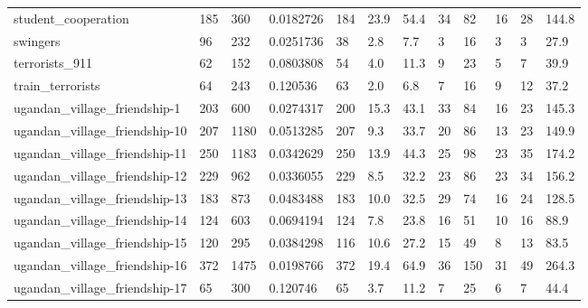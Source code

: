 \begin{longtable}{llllllllllll}
 student\_cooperation                                & 185        & 360       & 0.0182726   & 184   & 23.9   & 54.4   & 34    & 82     & 16     & 28     & 144.8   \\
 swingers                                           & 96         & 232       & 0.0251736   & 38    & 2.8    & 7.7    & 3     & 16     & 3      & 3      & 27.9    \\
 terrorists\_911                                     & 62         & 152       & 0.0803808   & 54    & 4.0    & 11.3   & 9     & 23     & 5      & 7      & 39.9    \\
 train\_terrorists                                   & 64         & 243       & 0.120536    & 63    & 2.0    & 6.8    & 7     & 16     & 9      & 12     & 37.2    \\
 ugandan\_village\_friendship-1                       & 203        & 600       & 0.0274317   & 200   & 15.3   & 43.1   & 33    & 84     & 16     & 23     & 145.3   \\
 ugandan\_village\_friendship-10                      & 207        & 1180      & 0.0513285   & 207   & 9.3    & 33.7   & 20    & 86     & 13     & 23     & 149.9   \\
 ugandan\_village\_friendship-11                      & 250        & 1183      & 0.0342629   & 250   & 13.9   & 44.3   & 25    & 98     & 23     & 35     & 174.2   \\
 ugandan\_village\_friendship-12                      & 229        & 962       & 0.0336055   & 229   & 8.5    & 32.2   & 23    & 86     & 23     & 34     & 156.2   \\
 ugandan\_village\_friendship-13                      & 183        & 873       & 0.0483488   & 183   & 10.0   & 32.5   & 29    & 74     & 16     & 24     & 128.5   \\
 ugandan\_village\_friendship-14                      & 124        & 603       & 0.0694194   & 124   & 7.8    & 23.8   & 16    & 51     & 10     & 16     & 88.9    \\
 ugandan\_village\_friendship-15                      & 120        & 295       & 0.0384298   & 116   & 10.6   & 27.2   & 15    & 49     & 8      & 13     & 83.5    \\
 ugandan\_village\_friendship-16                      & 372        & 1475      & 0.0198766   & 372   & 19.4   & 64.9   & 36    & 150    & 31     & 49     & 264.3   \\
 ugandan\_village\_friendship-17                      & 65         & 300       & 0.120746    & 65    & 3.7    & 11.2   & 7     & 25     & 6      & 7      & 44.4    \\

\end{longtable}
